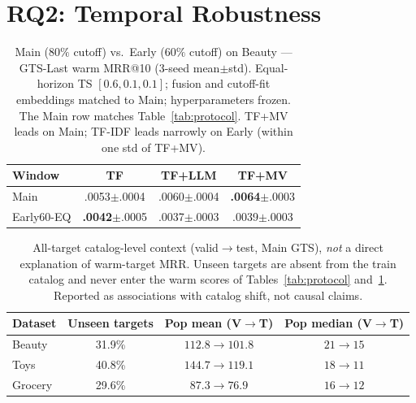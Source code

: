 \documentclass[sigconf,natbib=true,anonymous]{acmart}
\newcommand{\tfidf}{\textsc{TF-IDF}\xspace}
\newcommand{\tfmv}{\textsc{TF+MV}\xspace}
\begin{document}
\section{RQ2: Temporal Robustness}
\label{sec:rq2}

\begin{table}[t]
\centering
\caption{%
Main ($80\%$ cutoff) vs.\ Early ($60\%$ cutoff) on Beauty --- GTS-Last warm MRR@10 (3-seed mean$\pm$std).
Equal-horizon TS $[0.6,0.1,0.1]$; fusion and cutoff-fit embeddings matched to Main; hyperparameters frozen.
The Main row matches Table~\ref{tab:protocol}.
\tfmv leads on Main; \tfidf leads narrowly on Early (within one std of \tfmv).%
}
\label{tab:early}
\small
\begin{tabular}{@{}lccc@{}}
\toprule
Window & TF & TF+LLM & TF+MV \\
\midrule
Main      & .0053\tiny{$\pm$.0004} & .0060\tiny{$\pm$.0004} & \textbf{.0064}\tiny{$\pm$.0003} \\
Early60-EQ & \textbf{.0042}\tiny{$\pm$.0005} & .0037\tiny{$\pm$.0003} & .0039\tiny{$\pm$.0003} \\
\bottomrule
\end{tabular}
\end{table}

\begin{table}[t]
\centering
\caption{%
All-target catalog-level context (valid$\to$test, Main GTS), \emph{not} a direct explanation of warm-target MRR.
Unseen targets are absent from the train catalog and never enter the warm scores of Tables~\ref{tab:protocol} and~\ref{tab:early}.
Reported as associations with catalog shift, not causal claims.%
}
\label{tab:shift}
\small
\setlength{\tabcolsep}{4pt}
\begin{tabular}{@{}lccc@{}}
\toprule
Dataset & Unseen targets & Pop mean (V$\to$T) & Pop median (V$\to$T) \\
\midrule
Beauty  & 31.9\% & $112.8 \to 101.8$ & $21 \to 15$ \\
Toys    & 40.8\% & $144.7 \to 119.1$ & $18 \to 11$ \\
Grocery & 29.6\% & $87.3 \to 76.9$ & $16 \to 12$ \\
\bottomrule
\end{tabular}
\end{table}
\end{document}
